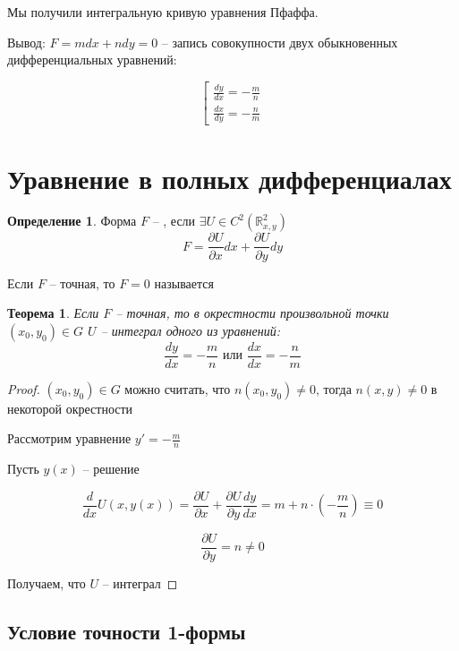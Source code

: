 \documentclass[a4paper]{article}
\theoremstyle{indented}
\newtheorem*{theorem}{Теорема}
\theoremstyle{definition}
\newtheorem*{defn}{Определение}
\theoremstyle{remark}
\begin{document}
Мы получили интегральную кривую уравнения Пфаффа.

Вывод: $F = m dx + n dy = 0$  -- запись совокупности двух обыкновенных дифференциальных уравнений:

\begin{equation*}
  \left[
    \begin{gathered}
      \frac{dy}{dx} = - \frac{m}{n}\\
      \frac{dx}{dy} = - \frac{n}{m}
    \end{gathered}
  \right.
\end{equation*}
  
  
\section{Уравнение в полных дифференциалах}

\begin{defn}
  Форма $F$ -- , если $\exists U \in C^2(\mathbb{R}_{x,y}^2)$
  \[F = \frac{\partial U}{\partial x} dx + \frac{\partial U}{\partial y} dy  \]

  Если $F$ -- точная, то $F = 0$ называется 
\end{defn}

\begin{theorem}
  Если $F$ -- точная, то в окрестности произвольной точки $(x_0,y_0) \in G$ $U$ -- интеграл одного из уравнений:
  \[\frac{dy}{dx} = - \frac{m}{n} \text{ или } \frac{dx}{dx} = - \frac{n}{m}  \]
\end{theorem}
\begin{proof}
  $(x_0,y_0) \in  G$ можно считать, что $n(x_0,y_0) \neq 0$, тогда $n(x,y) \neq 0$ в некоторой окрестности

  Рассмотрим уравнение $y' =- \frac{m}{n}$

  Пусть $y(x)$ -- решение

  \[\frac{d}{dx}U(x,y(x)) = \frac{\partial U}{\partial x} + \frac{\partial U}{\partial y} \frac{dy}{dx}  = m + n \cdot(- \frac{m}{n}) \equiv 0  \]

  \[\frac{\partial U}{\partial y} = n \neq 0\]

  Получаем, что $U$ -- интеграл
  
\end{proof}

\subsection{Условие точности 1-формы}
\end{document}
